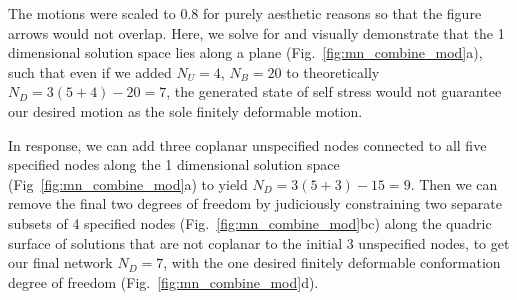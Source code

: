 \documentclass[%
preprint,
 amsmath,amssymb,
 aps,
]{revtex4-1}
\begin{document}
The motions were scaled to 0.8 for purely aesthetic reasons so that the figure arrows would not overlap. Here, we solve for and visually demonstrate that the 1 dimensional solution space lies along a plane (Fig.~\ref{fig:mn_combine_mod}a), such that even if we added $N_U = 4$, $N_B = 20$ to theoretically $N_D = 3(5+4)-20 = 7$, the generated state of self stress would not guarantee our desired motion as the sole finitely deformable motion. 

In response, we can add three coplanar unspecified nodes connected to all five specified nodes along the 1 dimensional solution space (Fig~\ref{fig:mn_combine_mod}a) to yield $N_D = 3(5+3) - 15 = 9$. Then we can remove the final two degrees of freedom by judiciously constraining two separate subsets of 4 specified nodes (Fig.~\ref{fig:mn_combine_mod}bc) along the quadric surface of solutions that are not coplanar to the initial 3 unspecified nodes, to get our final network $N_D = 7$, with the one desired finitely deformable conformation degree of freedom (Fig.~\ref{fig:mn_combine_mod}d). 
\end{document}
